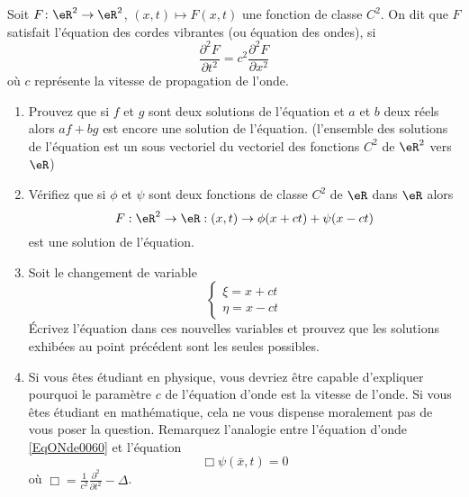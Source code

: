 
\begin{exercice}\label{exo0060}

Soit $F\colon \eR^2\to \eR^2$,  $(x,t) \mapsto F(x,t)$ une fonction de classe $C^2$. On dit que $F$ satisfait l'équation des cordes vibrantes (ou équation des ondes), si 
\begin{equation}		\label{EqONde0060}
	\frac{\partial^2 F}{\partial t^2 } = c^2 \frac{\partial^2 F}{\partial x^2}
\end{equation}
 où $c$ représente la vitesse de propagation de l'onde.

\begin{enumerate}
\item
Prouvez que si $f$ et $g$ sont deux solutions de l'équation et $a$ et $b$ deux réels alors $af+bg$ est  encore une solution de l'équation.  (l'ensemble des solutions de l'équation est un sous vectoriel du vectoriel des fonctions $C^2$ de $\eR^2$ vers $\eR$)
\item

Vérifiez que si $\phi$ et $\psi$ sont deux fonctions de classe $C^2$ de
$\eR$ dans $\eR$ alors
\[
F: \eR^2 \rightarrow \eR: (x,t) \rightarrow \phi(x+ct) + \psi(x-ct)
\]
est une solution de l'équation.
\item
Soit le changement de variable
\[
\left\{ \begin{array}{l} \xi = x + c t \\ \eta = x-ct \end{array} \right.
\]
Écrivez l'équation dans ces nouvelles variables et prouvez que les solutions exhibées au point précédent sont les seules possibles.

\item
Si vous êtes étudiant en physique, vous devriez être capable d'expliquer pourquoi le paramètre $c$ de l'équation d'onde est la vitesse de l'onde. Si vous êtes étudiant en mathématique, cela ne vous dispense moralement pas de vous poser la question. Remarquez l'analogie entre l'équation d'onde \eqref{EqONde0060} et l'équation 
\begin{equation}
	\Box \psi(\bar x,t)=0
\end{equation}
où $\Box =\frac{1}{ c^2 }\frac{ \partial^2 }{ \partial t^2 }-\Delta$. 
\end{enumerate}


\end{exercice}
